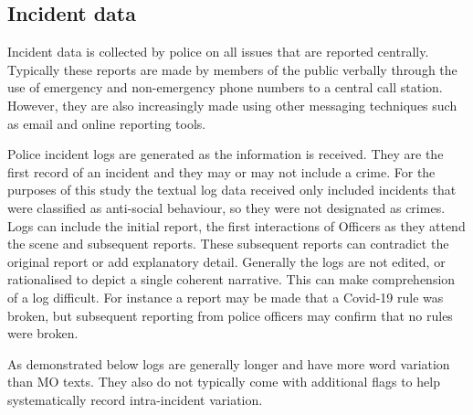 \subsection{Incident data} Incident data is collected by police on all issues that are reported centrally. Typically these reports are made by members of the public verbally through the use of emergency and non-emergency phone numbers to a central call station. However, they are also increasingly made using other messaging techniques such as email and online reporting tools.

Police incident logs are generated as the information is received. They are the first record of an incident and they may or may not include a crime. For the purposes of this study the textual log data received only included incidents that were classified as anti-social behaviour, so they were not designated as crimes. Logs can include the initial report, the first interactions of Officers as they attend the scene and subsequent reports. These subsequent reports can contradict the original report or add explanatory detail. Generally the logs are not edited, or rationalised to depict a single coherent narrative. This can make comprehension of a log difficult. For instance a report may be made that a Covid-19 rule was broken, but subsequent reporting from police officers may confirm that no rules were broken.

As demonstrated below logs are generally longer and have more word variation than MO texts. They also do not typically come with additional flags to help systematically record intra-incident variation.


